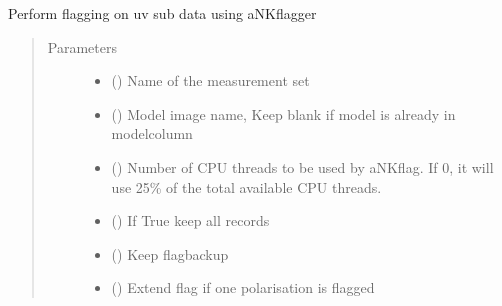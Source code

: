 \documentclass[letterpaper,10pt,english]{sphinxmanual}
\begin{document}
\begin{fulllineitems}
\label{\detokenize{paircars:paircars.flagger.do_uvsub_ankflag}}
\sphinxAtStartPar
Perform flagging on uv sub data using aNKflagger
\begin{quote}\begin{description}
\item[{Parameters}] \leavevmode\begin{itemize}
\item {} 
\sphinxAtStartPar
{} () \textendash{} Name of the measurement set

\item {} 
\sphinxAtStartPar
{} () \textendash{} Model image name, Keep blank if model is already in modelcolumn

\item {} 
\sphinxAtStartPar
{} () \textendash{} Number of CPU threads to be used by aNKflag. If 0, it will use 25\% of the total available CPU threads.

\item {} 
\sphinxAtStartPar
{} () \textendash{} If True keep all records

\item {} 
\sphinxAtStartPar
{} () \textendash{} Keep flagbackup

\item {} 
\sphinxAtStartPar
{} () \textendash{} Extend flag if one polarisation is flagged


\end{itemize}
\end{description}
\end{quote}
\end{fulllineitems}
\end{document}
